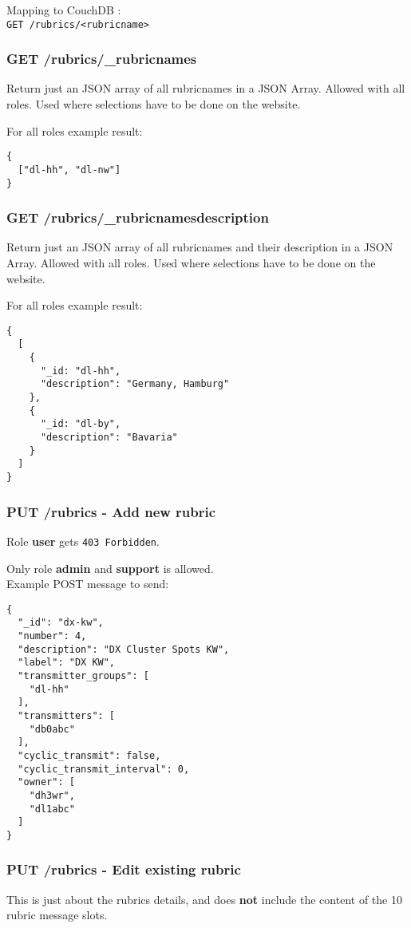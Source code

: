 Mapping to CouchDB :\\
\verb|GET /rubrics/<rubricname>|


\subsubsection{GET /rubrics/\_rubricnames}
Return just an JSON array of all rubricnames in a JSON Array. Allowed with all roles. Used where selections have to be done on the website.

For all roles example result:
\begin{lstlisting}
{
  ["dl-hh", "dl-nw"]
}
\end{lstlisting}

\subsubsection{GET /rubrics/\_rubricnamesdescription}
Return just an JSON array of all rubricnames and their description in a JSON Array. Allowed with all roles. Used where selections have to be done on the website.

For all roles example result:
\begin{lstlisting}
{
  [
    {
      "_id: "dl-hh",
      "description": "Germany, Hamburg"
    },
    {
      "_id: "dl-by",
      "description": "Bavaria"
    }
  ]  
}
\end{lstlisting}

\subsubsection{PUT /rubrics - Add new rubric}
Role \textbf{user} gets \verb|403 Forbidden|.

Only role \textbf{admin} and \textbf{support} is allowed.\\
Example POST message to send:
\begin{lstlisting}
{
  "_id": "dx-kw",
  "number": 4,
  "description": "DX Cluster Spots KW",
  "label": "DX KW",
  "transmitter_groups": [
    "dl-hh"
  ],
  "transmitters": [
    "db0abc"
  ],
  "cyclic_transmit": false,
  "cyclic_transmit_interval": 0,
  "owner": [
    "dh3wr",
    "dl1abc"
  ]
}
\end{lstlisting}

\subsubsection{PUT /rubrics - Edit existing rubric}
This is just about the rubrics details, and does \textbf{not} include the content of the 10 rubric message slots.

